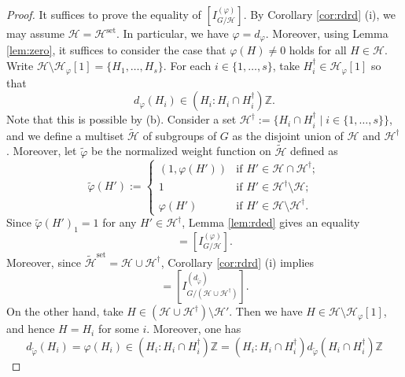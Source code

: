\documentclass[12pt]{amsart}
\theoremstyle{plain}
\theoremstyle{definition}
\numberwithin{thm}{section}
\numberwithin{equation}{section}
\newcommand{\Z}{\mathbb{Z}}
\newcommand{\cH}{\mathcal{H}}
\DeclareMathOperator{\set}{set}
\begin{document}
\begin{proof}
It suffices to prove the equality of $[I_{G/\cH}^{(\varphi)}]$. By Corollary \ref{cor:rdrd} (i), we may assume $\cH=\cH^{\set}$. In particular, we have $\varphi=d_{\varphi}$. Moreover, using Lemma \ref{lem:zero}, it suffices to consider the case that $\varphi(H)\neq 0$ holds for all $H\in \cH$. Write $\cH \setminus \cH_{\varphi}[1]=\{H_{1},\ldots,H_{s}\}$. For each $i\in \{1,\ldots,s\}$, take $H_{i}^{\dagger}\in \cH_{\varphi}[1]$ so that 
\begin{equation}\label{eq:hdir}
    d_{\varphi}(H_{i})\in (H_{i}:H_{i}\cap H_{i}^{\dagger})\Z. 
\end{equation}
Note that this is possible by (b). Consider a set $\cH^{\dagger}:=\{H_{i}\cap H_{i}^{\dagger}\mid i\in \{1,\ldots,s\}\}$, and we define a multiset $\widetilde{\cH}$ of subgroups of $G$ as the disjoint union of $\cH$ and $\cH^{\dagger}$. Moreover, let $\widetilde{\varphi}$ be the normalized weight function on $\widetilde{\cH}$ defined as
\begin{equation*}
    \widetilde{\varphi}(H'):=
    \begin{cases}
        (1,\varphi(H'))&\text{if }H'\in \cH\cap \cH^{\dagger};\\
        1&\text{if $H'\in \cH^{\dagger}\setminus \cH$;}\\
        \varphi(H')&\text{if }H'\in \cH\setminus \cH^{\dagger}. 
    \end{cases}
\end{equation*}
Since $\widetilde{\varphi}(H')_{1}=1$ for any $H'\in \cH^{\dagger}$, Lemma \ref{lem:rded} gives an equality
\begin{equation*}
[I_{G/\widetilde{\cH}}^{(\widetilde{\varphi})}]=[I_{G/\cH}^{(\varphi)}]. 
\end{equation*}
Moreover, since $\widetilde{\cH}^{\set}=\cH\cup \cH^{\dagger}$, Corollary \ref{cor:rdrd} (i) implies
\begin{equation*}
[I_{G/\widetilde{\cH}}^{(\widetilde{\varphi})}]=[I_{G/(\cH\cup \cH^{\dagger})}^{(d_{\widetilde{\varphi}})}].  
\end{equation*}
On the other hand, take $H\in (\cH \cup \cH^{\dagger})\setminus \cH'$. Then we have $H\in \cH \setminus \cH_{\varphi}[1]$, and hence $H=H_{i}$ for some $i$. Moreover, one has
\begin{equation*}
d_{\widetilde{\varphi}}(H_{i})=\varphi(H_{i})\in (H_{i}:H_{i}\cap H_{i}^{\dagger})\Z=(H_{i}:H_{i}\cap H_{i}^{\dagger})d_{\widetilde{\varphi}}(H_{i}\cap H_{i}^{\dagger})\Z
\end{equation*}

\end{proof}
\end{document}
